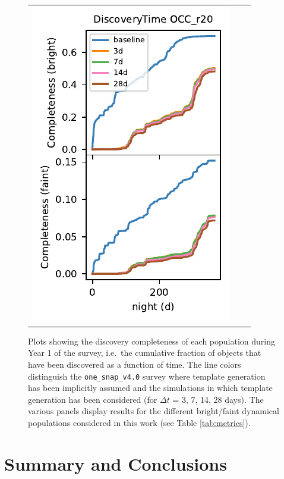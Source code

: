 \documentclass[preprintm,linenumbers]{aastex631}
\newcommand{\baseline}{\texttt{one\_snap\_v4.0}\xspace}
\begin{document}
\begin{figure}
\begin{tabular}{@{}c@{}c@{}c@{}}
				\includegraphics{results/DiscoveryTime_OCC_r20_first_year_one_snap_v4_0_10yrs_db_n_visits_4_noDD_noTwi.pdf} \\
			\end{tabular}
			\caption{Plots showing the discovery completeness of each population during Year 1 of the survey, i.e.\ the cumulative fraction of objects that have been discovered as a function of time.
				The line colors distinguish the \baseline survey where template generation has been implicitly assumed and the simulations in which template generation has been considered (for $\Delta t$ = 3, 7, 14, 28 days).
				The various panels display results for the different bright/faint dynamical populations considered in this work (see Table \ref{tab:metrics}).
			}
			\label{fig:completeness_over_time}
		\end{figure}
		
		\section{Summary and Conclusions}
		\label{sec:summary_conclusions}
		
\end{document}
